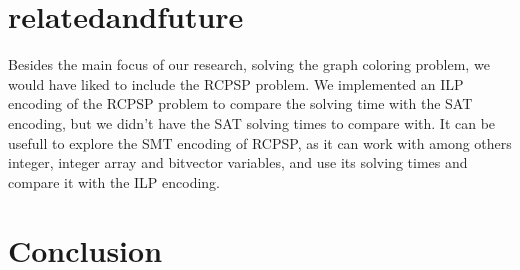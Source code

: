 \documentclass{sig-alternate}
\begin{document}
\section{relatedandfuture}
Besides the main focus of our research, solving the graph coloring problem, we would have liked to include
the RCPSP problem.
We implemented an ILP encoding of the RCPSP problem to compare the solving time with the SAT encoding, 
but we didn't have the SAT solving times to compare with. 
It can be usefull to explore the SMT encoding of RCPSP, as it can work with among others integer, 
integer array and bitvector variables, and use its solving times and compare it with the ILP encoding.

\cite{alves2013resource}
\cite{abio2014encoding}
\cite{wu2013exploiting}
\cite{velev2009exploiting}
\cite{horbach2010boolean}
\cite{klein1999computing}
\cite{mingozzi1998exact}
\cite{sharma2011polynomial}
\cite{ramani2004breaking}
\cite{schutt2011explaining}
\cite{wille2008using}
\cite{malaguti2010survey}
\cite{cs395tGCtoSAT}

\section{Conclusion}



\end{document}
